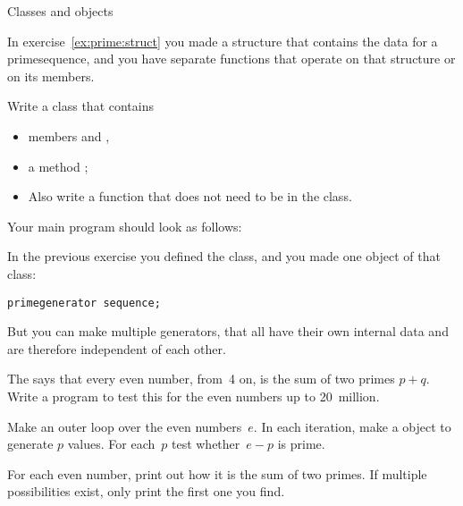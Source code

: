  {Classes and objects}

\prerequisite{\ref{sec:object}}

In exercise~\ref{ex:prime:struct} you made a structure that contains
the data for a primesequence, and you have separate functions that
operate on that structure or on its members.

\begin{exercise}
  \label{ex:prime:sequence}
  Write a class  that contains 
  \begin{itemize}
  \item members   and
    ,
  \item a method ;
  \item Also write a function  that does not need to be
    in the class.
  \end{itemize}

  Your main program should look as follows:
\end{exercise}

In the previous exercise you defined the  class, and
you made one object of that class:
\begin{verbatim}
primegenerator sequence;
\end{verbatim}
But you can make multiple generators, that all have their own internal
data and are therefore independent of each other.

\begin{exercise}
  \label{ex:goldbach:conj}
  The  says that every even number,
  from~4 on, is the sum of two primes $p+q$. Write a program to test this
  for the even numbers up to 20~million.

  Make an outer loop over the even numbers~$e$. In each iteration,
  make a  object to generate $p$ values.
  For each~$p$ test whether~$e-p$ is prime.

  For each even number, print out how it is the sum of two primes. If
  multiple possibilities exist, only print the first one you find.
\end{exercise}

